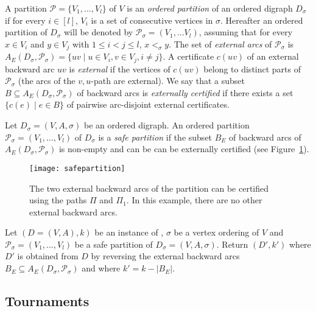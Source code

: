 A partition $\mathcal{P} = \{V_1, \dots, V_l\}$ of $V$ is an \emph{ordered partition} of an ordered digraph $D_\sigma$ if for every $i \in [l]$, $V_i$ is a set of consecutive vertices in $\sigma$. Hereafter an ordered partition of $D_\sigma$ will be denoted by $\mathcal{P}_\sigma=(V_1,\dots V_l)$, assuming that for every $x\in V_i$ and $y\in V_j$ with $1\leqslant i<j\leqslant l$, $x<_\sigma y$. The set of \emph{external arcs} of $\mathcal{P}_\sigma$ is $A_E(D_{\sigma},\mathcal{P}_\sigma)=\{uv\mid u\in V_i, v\in V_j, i\neq j\}$. A certificate $c(uv)$ of an external backward arc $uv$ is \emph{external} if the vertices of $c(uv)$ belong to distinct parts of $\mathcal{P}_\sigma$ (the arcs of the $v,u$-path are external). We say that a subset $B\subseteq A_E(D_{\sigma},\mathcal{P}_\sigma)$ of backward arcs is \emph{externally certified} if there exists a set $\{c(e)\mid e\in B\}$ of pairwise arc-disjoint external certificates.
	
	
\begin{definition} 
Let $D_\sigma = (V, A, \sigma)$ be an ordered digraph. An ordered partition $\mathcal{P}_\sigma = (V_1,\dots,V_l)$ of $D_\sigma$ is a \emph{safe partition} if the subset $B_E$ of backward arcs of $A_E(D_{\sigma},\mathcal{P}_\sigma)$ is non-empty and can be can be externally certified (see Figure~\ref{fig:spfasbt}).
\end{definition}
	
\begin{figure}[h]
\centerline{\texttt{[image: safepartition]}}
\caption{The two external backward arcs of the partition can be certified using the paths $\Pi$ and $\Pi_1$. In this example, there are no other external backward arcs. \label{fig:spfasbt}}
\end{figure} 
	
\begin{polyrule} \label{rule:safepartition}
Let $(D=(V,A),k)$ be an instance of \FAS{}, $\sigma$ be a vertex ordering of $V$ and $\mathcal{P}_\sigma = (V_1,\dots,V_l)$ be a safe partition of  $D_\sigma = (V, A, \sigma)$. Return $(D',k')$ where $D'$ is obtained from $D$ by reversing the external backward arcs $B_E\subseteq A_E(D_{\sigma},\mathcal{P}_\sigma)$ and where $k'=k-|B_E|$.
\end{polyrule}


\subsection{Tournaments}

